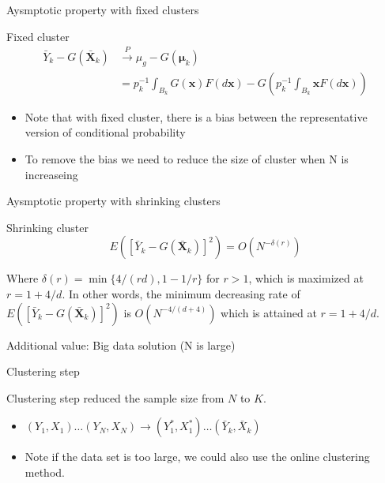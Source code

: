 \documentclass[ignorenonframetext,]{beamer}
\providecommand{\tightlist}{%
  \setlength{\itemsep}{0pt}\setlength{\parskip}{0pt}}
\begin{document}
\begin{frame}{Aysmptotic property with fixed clusters}

\begin{block}{Fixed cluster}
\begin{align*}
\bar{Y}_k - G(\bar{\mathbf X}_k) &\stackrel{P}{\longrightarrow} \mu_g - G(\boldsymbol{\mu}_k)\\
& = p_k^{-1} \int_{B_k} G({\mathbf x}) F(d{\mathbf x}) - G\left(p_k^{-1} \int_{B_k} {\mathbf x} F(d{\mathbf x})\right)
\end{align*}
\end{block}

\begin{itemize}
\tightlist
\item
  Note that with fixed cluster, there is a bias between the
  representative version of conditional probability
\item
  To remove the bias we need to reduce the size of cluster when N is
  increaseing
\end{itemize}

\end{frame}

\begin{frame}{Aysmptotic property with shrinking clusters}

\begin{block}{Shrinking cluster}
\[
E([\bar{Y}_k - G(\bar{\mathbf X}_k)]^2) = O(N^{-\delta(r)})
\]
\end{block}

Where \(\delta(r) = \min\{4/(rd), 1-1/r\}\) for \(r>1\), which is
maximized at \(r = 1 + 4/d\). In other words, the minimum decreasing
rate of \(E([\bar{Y}_k - G(\bar{\mathbf X}_k)]^2)\) is
\(O(N^{-4/(d+4)})\) which is attained at \(r= 1 + 4/d\).

\end{frame}

\begin{frame}{Additional value: Big data solution (N is large)}

\begin{block}{Clustering step}

Clustering step reduced the sample size from \(N\) to \(K\).

\begin{itemize}
\item
  \((Y_1,X_1) \dots (Y_N,X_N) \to (Y^*_{1},X^*_{1}) \dots (\bar{Y}_k,\bar{X}_k)\)
\item
  Note if the data set is too large, we could also use the online
  clustering method.
\end{itemize}

\end{block}

\end{frame}
\end{document}
